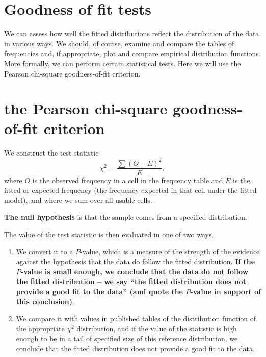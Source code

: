 \documentclass[landscape, 20pt]{extreport}
\theoremstyle{definition}
\theoremstyle{definition}
\theoremstyle{definition}
\theoremstyle{definition}
\theoremstyle{remark}
\begin{document}
\hypertarget{goodness-of-fit-tests}{%
\section{Goodness of fit tests}\label{goodness-of-fit-tests}}

We can assess how well the fitted distributions reflect the distribution
of the data in various ways. We should, of course, examine and compare
the tables of frequencies and, if appropriate, plot and compare
empirical distribution functions. More formally, we can perform certain
statistical tests. Here we will use the Pearson chi-square
goodness-of-fit criterion.

\hypertarget{the-pearson-chi-square-goodness-of-fit-criterion}{%
\section{the Pearson chi-square goodness-of-fit criterion}\label{the-pearson-chi-square-goodness-of-fit-criterion}}

We construct the test statistic \[\chi^2 = \frac{\sum(O - E)^2}{E},\]
where \(O\) is the observed frequency in a cell in the frequency table and
\(E\) is the fitted or expected frequency (the frequency expected in that
cell under the fitted model), and where we sum over all usable cells.

\textbf{The null hypothesis} is that the sample comes from a specified
distribution.

The value of the test statistic is then evaluated in one of two ways.

\begin{enumerate}
\def\labelenumi{\arabic{enumi}.}
\item
  We convert it to a \(P\)-value, which is a measure of the strength of
  the evidence against the hypothesis that the data do follow the
  fitted distribution. \textbf{If the \(P\)-value is small enough, we conclude
  that the data do not follow the fitted distribution -- we say ``the
  fitted distribution does not provide a good fit to the data'' (and
  quote the \(P\)-value in support of this conclusion)}.
\item
  We compare it with values in published tables of the distribution
  function of the appropriate \(\chi^2\) distribution, and if the value
  of the statistic is high enough to be in a tail of specified size of
  this reference distribution, we conclude that the fitted
  distribution does not provide a good fit to the data.
\end{enumerate}
\end{document}
